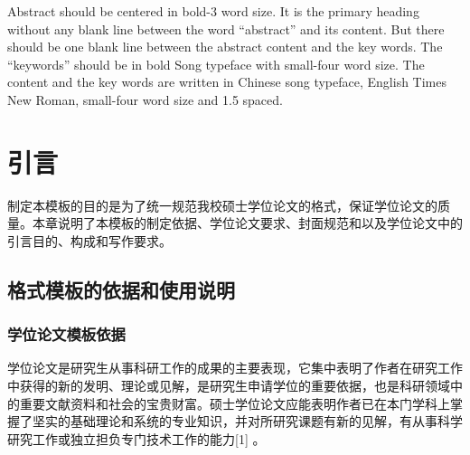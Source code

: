 \documentclass{cqupt_thesis}
\begin{document}
\begin{enabstract}
        Abstract should be centered in bold-3 word size. It is the primary heading without any blank line between the word “abstract” and its content. But there should be one blank line between the abstract content and the key words. The “keywords” should be in bold Song typeface with small-four word size. The content and the key words are written in Chinese song typeface, English Times New Roman, small-four word size and 1.5 spaced.

    \end{enabstract}

    \maketoc %

    \makefigtablist %



    \initmaincontent %

    \chapter{引言}

    制定本模板的目的是为了统一规范我校硕士学位论文的格式，保证学位论文的质量。本章说明了本模板的制定依据、学位论文要求、封面规范和以及学位论文中的引言目的、构成和写作要求。

    \section{格式模板的依据和使用说明}

    \subsection{学位论文模板依据}

    学位论文是研究生从事科研工作的成果的主要表现，它集中表明了作者在研究工作中获得的新的发明、理论或见解，是研究生申请学位的重要依据，也是科研领域中的重要文献资料和社会的宝贵财富。硕士学位论文应能表明作者已在本门学科上掌握了坚实的基础理论和系统的专业知识，并对所研究课题有新的见解，有从事科学研究工作或独立担负专门技术工作的能力[1] 。
\end{document}

